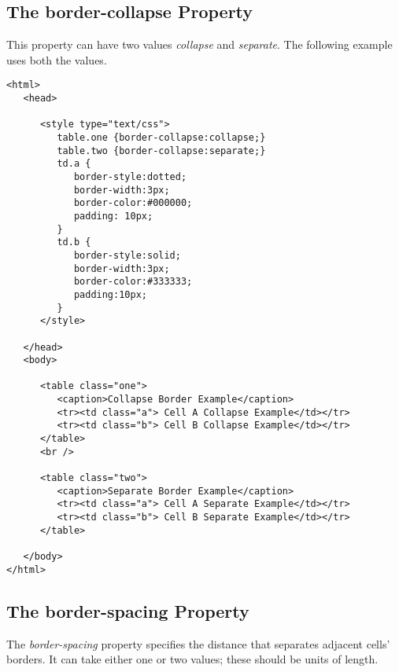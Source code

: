 \documentclass[a4paper,oneside]{book}
\numberwithin{equation}{chapter}
\begin{document}
\subsection{The border-collapse Property}
This property can have two values \textit{collapse} and \textit{separate}. The following example uses both the values.
\begin{verbatim}
<html>
   <head>
   
      <style type="text/css">
         table.one {border-collapse:collapse;}
         table.two {border-collapse:separate;}
         td.a {
            border-style:dotted;
            border-width:3px;
            border-color:#000000; 
            padding: 10px;
         }
         td.b {
            border-style:solid;
            border-width:3px;
            border-color:#333333;
            padding:10px;
         }
      </style>
      
   </head>
   <body>
   
      <table class="one">
         <caption>Collapse Border Example</caption>
         <tr><td class="a"> Cell A Collapse Example</td></tr>
         <tr><td class="b"> Cell B Collapse Example</td></tr>
      </table>
      <br />
      
      <table class="two">
         <caption>Separate Border Example</caption>
         <tr><td class="a"> Cell A Separate Example</td></tr>
         <tr><td class="b"> Cell B Separate Example</td></tr>
      </table>
      
   </body>
</html> 
\end{verbatim}
\subsection{The border-spacing Property}
The \textit{border-spacing} property specifies the distance that separates adjacent cells' borders. It can take either one or two values; these should be units of length.
\end{document}
